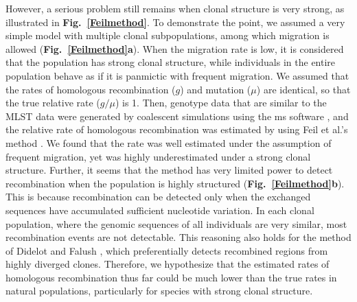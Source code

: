 \documentclass[twoside,twocolumn, letterpaper]{article}
\begin{document}
However, a serious problem still remains when clonal structure is very strong, as illustrated in {\bf Fig.~\ref{Feilmethod}}. To demonstrate the point, we assumed a very simple model with multiple clonal subpopulations, among which migration is allowed ({\bf Fig.~\ref{Feilmethod}a}). When the migration rate is low, it is considered that the population has strong clonal structure, while individuals in the entire population behave as if it is panmictic with frequent migration. We assumed that the rates of homologous recombination ($g$) and mutation ($\mu$) are identical, so that the true relative rate ($g/\mu$) is 1. Then, genotype data that are similar to the MLST data were generated by coalescent simulations using the {\sf ms} software \cite[]{Hudson_2002_11847089}, and the relative rate of homologous recombination was estimated by using Feil et al.'s method \cite{Feil_1999_10555280,Feil_2000_10747043}. We found that the rate was well estimated under 
the assumption of frequent migration, yet was highly underestimated under a strong clonal structure. Further, it seems that the method has very limited power to detect recombination when the population is highly structured ({\bf Fig.~\ref{Feilmethod}b}). This is because recombination can be detected only when the exchanged sequences have accumulated sufficient nucleotide variation. In each clonal population, where the genomic sequences of all individuals are very similar, most recombination events are not detectable. This reasoning also holds for the method of Didelot and Falush \cite[]{Didelot_2007_17151252}, which preferentially detects recombined regions from highly diverged clones. Therefore, we hypothesize that the estimated rates of homologous recombination thus far could be much lower than the
 true rates in natural populations, particularly for species with strong clonal structure. 
\end{document}
